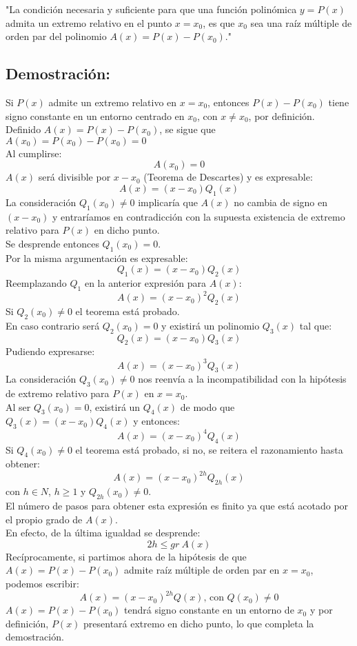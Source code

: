 \documentclass[12pt]{article}
\begin{document}
"La condición necesaria y suficiente para que una función polinómica $y=P(x)$ admita un extremo relativo en el punto $x={x}_0$, es que ${x}_0$ sea una raíz múltiple de orden par del polinomio $A(x)=P(x)-P({x}_0)$." \\


\subsection*{Demostración:}
Si $P(x)$ admite un extremo relativo en $x={x}_0$, entonces $P(x)-P({x}_0)$ tiene signo constante en un entorno centrado en ${x}_0$, con $x \neq {x}_0$, por definición. \\
Definido $A(x)=P(x)-P({x}_0)$, se sigue que $A({x}_0)=P({x}_0)-P({x}_0)=0$ \\
Al cumplirse:
$$
  A({x}_0)=0
$$
$A(x)$ será divisible por $x-{x}_0$ (Teorema de Descartes) y es expresable:
$$
  A(x)=(x-{x}_0){Q}_1(x)
$$
La consideración ${Q}_1({x}_0) \neq 0$ implicaría que $A(x)$ no cambia de signo en $(x-{x}_0)$ y entraríamos en contradicción con la supuesta existencia de extremo relativo para $P(x)$ en dicho punto. \\
Se desprende entonces ${Q}_1({x}_0) = 0$. \\
Por la misma argumentación es expresable:
$$
  {Q}_1(x) = (x-{x}_0){Q}_2(x)
$$
Reemplazando ${Q}_1$ en la anterior expresión para $A(x)$:
$$
  A(x)=(x-{x}_0)^2{Q}_2(x)
$$
Si ${Q}_2({x}_0) \neq 0$ el teorema está probado. \\
En caso contrario será ${Q}_2({x}_0)=0$ y existirá un polinomio ${Q}_3(x)$ tal que:
$$
  {Q}_2(x) = (x-{x}_0){Q}_3(x)
$$
Pudiendo expresarse:
$$
  A(x)=(x-{x}_0)^3{Q}_3(x)
$$
La consideración ${Q}_3({x}_0) \neq 0$ nos reenvía a la incompatibilidad con la hipótesis de extremo relativo para $P(x)$ en $x={x}_0$. \\
Al ser ${Q}_3({x}_0)=0$, existirá un ${Q}_4(x)$ de modo que ${Q}_3(x)=(x-{x}_0){Q}_4(x)$ y entonces:
$$
  A(x)=(x-{x}_0)^4 {Q}_4(x)
$$
Si ${Q}_4({x}_0) \neq 0$ el teorema está probado, si no, se reitera el razonamiento hasta obtener:
$$
  A(x)=(x-{x}_0)^{2h}{Q}_{2h}(x)
$$
con $h \in N$, $h \geqslant 1$ y ${Q}_{2h}({x}_0) \neq 0$. \\
El número de pasos para obtener esta expresión es finito ya que está acotado por el propio grado de $A(x)$. \\
En efecto, de la última igualdad se desprende:
$$
  2h \leqslant gr \ A(x)
$$
Recíprocamente, si partimos ahora de la hipótesis de que $A(x)=P(x)-P({x}_0)$ admite raíz múltiple de orden par en $x={x}_0$, podemos escribir:
$$
  A(x)=(x-{x}_0)^{2h}Q(x)\text{, \ con\ \ }Q({x}_0) \neq 0
$$
$A(x)=P(x)-P({x}_0)$ tendrá signo constante en un entorno de ${x}_0$ y por definición, $P(x)$ presentará extremo en dicho punto, lo que completa la demostración.
\clearpage
\end{document}
